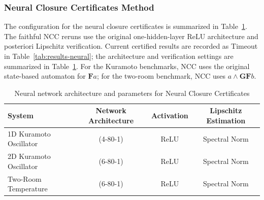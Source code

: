 \subsubsection{Neural Closure Certificates Method}
The configuration for the neural closure certificates is summarized in Table~\ref{tab:ncc_config}. The faithful NCC reruns use the original one-hidden-layer ReLU architecture and posteriori Lipschitz verification. Current certified results are recorded as Timeout in Table~\ref{tab:results-neural}; the architecture and verification settings are summarized in Table~\ref{tab:ncc_config}. For the Kuramoto benchmarks, NCC uses the original state-based automaton for $\mathbf{F}a$; for the two-room benchmark, NCC uses $a \land \mathbf{GF} b$.

\begin{table}[h]
\centering
\caption{Neural network architecture and parameters for Neural Closure Certificates}
\label{tab:ncc_config}
\begin{tabular}{lccc}
\hline
\textbf{System} & \textbf{Network Architecture} & \textbf{Activation} & \textbf{Lipschitz Estimation} \\
\hline
1D Kuramoto Oscillator & (4-80-1) & ReLU & Spectral Norm \\
2D Kuramoto Oscillator & (6-80-1) & ReLU & Spectral Norm \\
Two-Room Temperature & (6-80-1) & ReLU & Spectral Norm \\
\hline
\end{tabular}
\end{table}
